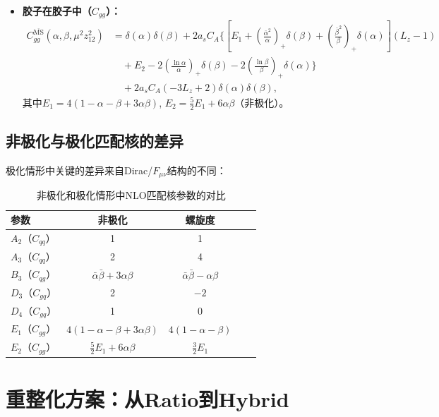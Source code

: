 \documentclass[12pt,a4paper]{ctexart}
\theoremstyle{definition}
\begin{document}
\begin{itemize}
    \item \textbf{胶子在胶子中（$C_{gg}$）：}
    \begin{equation}
    \begin{aligned}
    C^{\overline{\text{MS}}}_{gg}(\alpha, \beta, \mu^2 z^2_{12}) &= \delta(\alpha)\delta(\beta) + 2a_s C_A \Bigg\{ \left[E_1 + \left(\frac{\bar{\alpha}^2}{\alpha}\right)_+ \delta(\beta) + \left(\frac{\bar{\beta}^2}{\beta}\right)_+ \delta(\alpha)\right](L_z - 1) \\
    &\quad + E_2 - 2\left(\frac{\ln\alpha}{\alpha}\right)_+ \delta(\beta) - 2\left(\frac{\ln\beta}{\beta}\right)_+ \delta(\alpha) \Bigg\} \\
    &\quad + 2a_s C_A (-3L_z + 2)\delta(\alpha)\delta(\beta),
    \end{aligned}
    \end{equation}
    其中$E_1 = 4(1-\alpha-\beta+3\alpha\beta)$, $E_2 = \frac{5}{2}E_1 + 6\alpha\beta$（非极化）。
\end{itemize}

\subsection{非极化与极化匹配核的差异}

极化情形中关键的差异来自Dirac/$F_{\mu\nu}$结构的不同\cite{Yao2023}：

\begin{table}[H]
\centering
\caption{非极化和极化情形中NLO匹配核参数的对比\cite{Yao2023}}
\label{tab:unpol_vs_pol}
\begin{tabular}{lcccc}
\toprule
参数 & 非极化 & 螺旋度 \\
\midrule
$A_2$（$C_{qq}$）     & 1   & 1 \\
$A_3$（$C_{qq}$）     & 2   & 4 \\
$B_3$（$C_{qg}$）     & $\bar{\alpha}\bar{\beta}+3\alpha\beta$ & $\bar{\alpha}\bar{\beta}-\alpha\beta$ \\
$D_3$（$C_{gq}$）     & 2   & $-2$ \\
$D_4$（$C_{gq}$）     & 1   & 0 \\
$E_1$（$C_{gg}$）     & $4(1-\alpha-\beta+3\alpha\beta)$ & $4(1-\alpha-\beta)$ \\
$E_2$（$C_{gg}$）     & $\frac{5}{2}E_1 + 6\alpha\beta$ & $\frac{3}{2}E_1$ \\
\bottomrule
\end{tabular}
\end{table}

\section{重整化方案：从Ratio到Hybrid}
\end{document}
